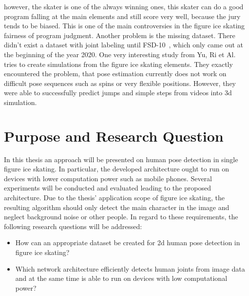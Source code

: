     however, the skater is one of the always winning
    ones, this skater can do a good program falling at the main elements and still score very well, because the
    jury tends to be biased.
    This is one of the main controversies in the figure ice skating fairness of program judgment.
    Another problem is the missing dataset.
    There didn't exist a dataset with joint labeling until FSD-10~\cite{fsd10}, which only came out at the
    beginning of the year 2020.
    One very interesting study from Yu, Ri et Al.~\cite{simplebaselines} tries to create simulations from the figure ice skating elements.
    They exactly encountered the problem, that pose estimation currently does not work on difficult pose sequences
    such as spins or very flexible positions.
    However, they were able to successfully predict jumps and simple steps from videos into 3d
    simulation.


\section{Purpose and Research Question}
In this thesis an approach will be presented on human pose detection in single figure ice skating.
In particular, the developed architecture ought to run on devices with lower computation power such as mobile phones.
Several experiments will be conducted and evaluated leading to the proposed architecture.
Due to the thesis' application scope of figure ice skating, the resulting algorithm should only detect the main
character in the image
and neglect background noise or other people.
In regard to these requirements, the following research questions will be addressed:
\begin{itemize}
    \item How can an appropriate dataset be created for 2d human pose detection in figure ice skating?
    \item Which network architecture efficiently detects human joints from image data and at the same time is able to
    run on devices with low computational power?
\end{itemize}

